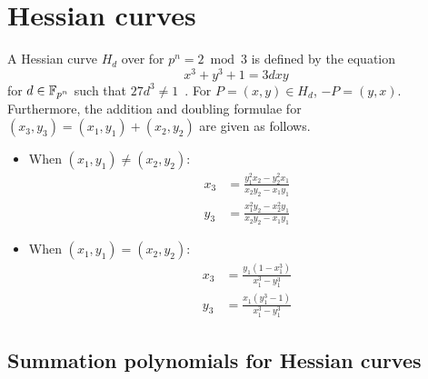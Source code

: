 %
%

\section{Hessian curves}
\label{sec:hessian}

%
A Hessian curve $H_d$ over  for $p^n=2\bmod 3$ is defined by
the equation \begin{equation}
  x^3+y^3+1=3dxy \label{eq:hessian-curve} \end{equation} for
$d\in\mathbb F_{p^n}$ such that $27d^3\neq 1$~\cite{DBLP:conf/ches/Smart01}.
%
For $P=(x,y)\in H_d$, $-P=(y,x)$.
%
Furthermore, the addition and doubling formulae for
$(x_3,y_3)=(x_1,y_1)+(x_2,y_2)$ are given as follows.
%
\begin{itemize}
\item When $(x_1,y_1)\neq(x_2,y_2)$:
  \begin{align*}
    x_3 & = \frac{y_1^2x_2 - y_2^2x_1}{x_2y_2 - x_1y_1} \\
    y_3 & = \frac{x_1^2y_2 - x_2^2y_1}{x_2y_2 - x_1y_1}
  \end{align*}
\item When $(x_1,y_1)=(x_2,y_2)$:
  \begin{align*}
    x_3 & = \frac{y_1(1 - x_1^3)}{x_1^3 - y_1^3} \\
    y_3 & = \frac{x_1(y_1^3 - 1)}{x_1^3 - y_1^3}
  \end{align*}
\end{itemize}


\subsection{Summation polynomials for Hessian curves}

